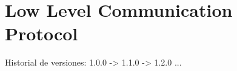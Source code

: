 \chapter{ Low Level Communication Protocol}
\label{finales:anexo1}
Historial de versiones: 1.0.0 -> 1.1.0 -> 1.2.0 ...